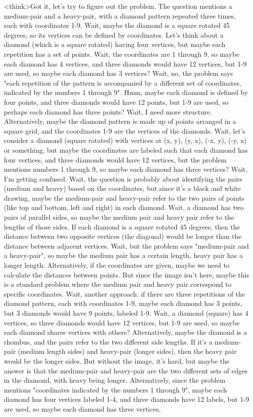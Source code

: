 <think>Got it, let's try to figure out the problem. The question mentions a medium-pair and a heavy-pair, with a diamond pattern repeated three times, each with coordinates 1-9. Wait, maybe the diamond is a square rotated 45 degrees, so its vertices can be defined by coordinates. Let's think about a diamond (which is a square rotated) having four vertices, but maybe each repetition has a set of points. Wait, the coordinates are 1 through 9, so maybe each diamond has 4 vertices, and three diamonds would have 12 vertices, but 1-9 are used, so maybe each diamond has 3 vertices? Wait, no, the problem says "each repetition of the pattern is accompanied by a different set of coordinates, indicated by the numbers 1 through 9". Hmm, maybe each diamond is defined by four points, and three diamonds would have 12 points, but 1-9 are used, so perhaps each diamond has three points? Wait, I need more structure. Alternatively, maybe the diamond pattern is made up of points arranged in a square grid, and the coordinates 1-9 are the vertices of the diamonds. Wait, let's consider a diamond (square rotated) with vertices at (x, y), (y, x), (-x, y), (-y, x) or something, but maybe the coordinates are labeled such that each diamond has four vertices, and three diamonds would have 12 vertices, but the problem mentions numbers 1 through 9, so maybe each diamond has three vertices? Wait, I'm getting confused. Wait, the question is probably about identifying the pairs (medium and heavy) based on the coordinates, but since it's a black and white drawing, maybe the medium-pair and heavy-pair refer to the two pairs of points (like top and bottom, left and right) in each diamond. Wait, a diamond has two pairs of parallel sides, so maybe the medium pair and heavy pair refer to the lengths of those sides. If each diamond is a square rotated 45 degrees, then the distance between two opposite vertices (the diagonal) would be longer than the distance between adjacent vertices. Wait, but the problem says "medium-pair and a heavy-pair", so maybe the medium pair has a certain length, heavy pair has a longer length. Alternatively, if the coordinates are given, maybe we need to calculate the distances between points. But since the image isn't here, maybe this is a standard problem where the medium pair and heavy pair correspond to specific coordinates. Wait, another approach: if there are three repetitions of the diamond pattern, each with coordinates 1-9, maybe each diamond has 3 points, but 3 diamonds would have 9 points, labeled 1-9. Wait, a diamond (square) has 4 vertices, so three diamonds would have 12 vertices, but 1-9 are used, so maybe each diamond shares vertices with others? Alternatively, maybe the diamond is a rhombus, and the pairs refer to the two different side lengths. If it's a medium-pair (medium length sides) and heavy-pair (longer sides), then the heavy pair would be the longer sides. But without the image, it's hard, but maybe the answer is that the medium-pair and heavy-pair are the two different sets of edges in the diamond, with heavy being longer. Alternatively, since the problem mentions "coordinates indicated by the numbers 1 through 9", maybe each diamond has four vertices labeled 1-4, and three diamonds have 12 labels, but 1-9 are used, so maybe each diamond has three vertices, 